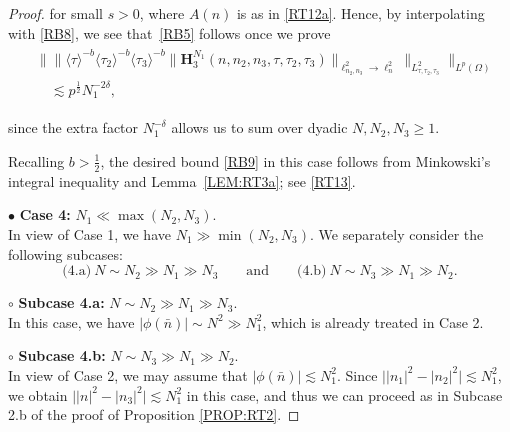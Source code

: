 \documentclass[%
11pt,  reqno]{amsart}
\newcommand{\1}{\hspace{0.2mm}\text{I}\hspace{0.2mm}}
\newcommand{\noi}{\noindent}
\newcommand{\dl}{\delta}
\renewcommand{\l}{\ell}
\renewcommand{\O}{\Omega}
\newcommand{\les}{\lesssim}
\newcommand{\jb}[1]
{\langle #1 \rangle}
\numberwithin{equation}{section}
\numberwithin{theorem}{section}
\newcommand{\Hb}{\mathbf{H}}
\begin{document}
\begin{proof}
\noi
for small $s > 0$, 
where $A(n)$ is as in \eqref{RT12a}.
Hence, by interpolating with \eqref{RB8}, we see that~\eqref{RB5} follows once we prove
\begin{align}
\begin{split}
& \Big\|
\big\|  \jb{\tau}^{-b} \jb{\tau_2}^{-b} \jb{\tau_3}^{-b}
\| \Hb_3^{N_1}(n,n_2,n_3,\tau,\tau_2,\tau_3) \|_{\l^2_{n_2, n_3} \to \l^2_n}  \big\|_{L^2_{\tau,\tau_2,\tau_3}}
\Big\|_{L^p(\O)}\\
& \quad \les p^\frac 12    N_1^{-2\dl}, 
\end{split}
\label{RB9}
\end{align}

\noi
since the extra factor $N_1^{-\dl}$
allows us to sum over dyadic $N, N_2, N_3 \ge 1$.





Recalling $ b > \frac 12$, 
the desired bound \eqref{RB9} in this case 
follows from Minkowski's integral inequality and
Lemma~\ref{LEM:RT3a};
see \eqref{RT13}.












\medskip

\noi 
$\bullet$ {\bf Case 4:}
$N_1  \ll \max(N_2, N_3)$.
\\
\indent
In view of Case 1, we have $N_1 \gg \min (N_2, N_3)$.
We separately consider the following subcases:
\[ \text{(4.a)}
\  N\sim N_2 \gg N_1 \gg N_3
\qquad \text{and}
\qquad 
\text{(4.b)}
\  N\sim N_3 \gg N_1 \gg N_2.
\]







\noi
$\pmb\circ$ {\bf Subcase 4.a:}
 $N\sim N_2 \gg N_1 \gg N_3$.
\\
\indent
In this case, we have $|\phi(\bar n)| \sim N^2 \gg N_1^2$, 
which is already treated in Case 2.


\medskip

\noi
$\pmb\circ$ {\bf Subcase 4.b:}
 $N\sim N_3 \gg N_1 \gg N_2$.
\\
\indent
In view of Case 2, we may assume that 
$|\phi(\bar n)| \les  N_1^2$.
Since $\big||n_1|^2 - |n_2|^2\big| \les N_1^2$, 
we obtain
$\big||n|^2 - |n_3|^2\big| \les N_1^2$
in this case, 
and thus we can proceed as in Subcase 2.b of the proof 
of Proposition \ref{PROP:RT2}.







\end{proof}
\end{document}
